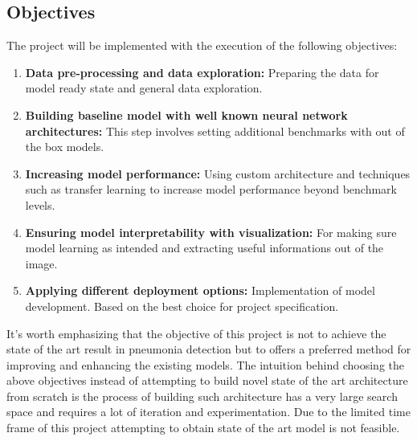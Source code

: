 \subsection{Objectives}
The project will be implemented with the execution of the following objectives:
\begin{enumerate}
    \item \textbf{Data pre-processing and data exploration: }Preparing the data for model ready state and general data exploration.
    \item \textbf{Building baseline model with well known neural network architectures: }This step involves setting additional benchmarks with out of the box models.
    \item \textbf{Increasing model performance: }Using custom architecture and techniques such as transfer learning to increase model performance beyond benchmark levels.
    \item \textbf{Ensuring model interpretability with visualization: } For making sure model learning as intended and extracting useful informations out of the image.
    \item \textbf{Applying different deployment options: } Implementation of model development. Based on the best choice for project specification.
\end{enumerate}
It's worth emphasizing that the objective of this project is not to achieve the state of the art result in pneumonia detection but to offers a preferred method for improving and enhancing the existing models.
The intuition behind choosing the above objectives instead of attempting to build novel state of the art architecture from scratch is the process of building such architecture has a very large search space and requires a lot of iteration and experimentation. 
Due to the limited time frame of this project attempting to obtain state of the art model is not feasible. 


